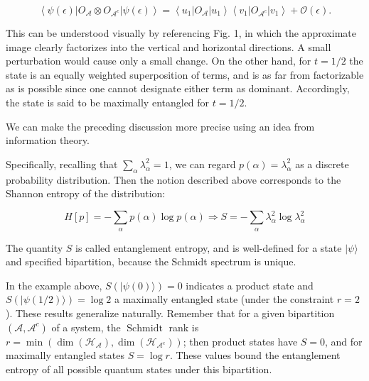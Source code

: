 \documentclass[12pt]{article}
\begin{document}
\begin{equation*}
\left\langle\psi(\epsilon)\left|O_{\mathcal{A}} \otimes O_{\mathcal{A}^{c}}\right| \psi(\epsilon)\right\rangle=\left\langle u_{1}\left|O_{\mathcal{A}}\right| u_{1}\right\rangle\left\langle v_{1}\left|O_{\mathcal{A}^{c}}\right| v_{1}\right\rangle+\mathcal{O}(\epsilon) . \tag{8}
\end{equation*}


This can be understood visually by referencing Fig. 1, in which the approximate image clearly factorizes into the vertical and horizontal directions. A small perturbation would cause only a small change. On the other hand, for $t=1 / 2$ the state is an equally weighted superposition of terms, and is as far from factorizable as is possible since one cannot designate either term as dominant. Accordingly, the state is said to be maximally entangled for $t=1 / 2$.

We can make the preceding discussion more precise using an idea from information theory.

Specifically, recalling that $\sum_{\alpha} \lambda_{\alpha}^{2}=1$, we can regard $p(\alpha)=\lambda_{\alpha}^{2}$ as a discrete probability distribution. Then the notion described above corresponds to the Shannon entropy of the distribution:


\begin{equation*}
H[p]=-\sum_{\alpha} p(\alpha) \log p(\alpha) \Longrightarrow S=-\sum_{\alpha} \lambda_{\alpha}^{2} \log \lambda_{\alpha}^{2} \tag{9}
\end{equation*}


The quantity $S$ is called entanglement entropy, and is well-defined for a state $|\psi\rangle$ and specified bipartition, because the Schmidt spectrum is unique.

In the example above, $S(|\psi(0)\rangle)=0$ indicates a product state and $S(|\psi(1 / 2)\rangle)=\log 2$ a maximally entangled state (under the constraint $r=2$ ). These results generalize naturally. Remember that for a given bipartition $\left(\mathcal{A}, \mathcal{A}^{c}\right)$ of a system, the $\operatorname{Schmidt}$ rank is $r=\min \left(\operatorname{dim}\left(\mathcal{H}_{\mathcal{A}}\right), \operatorname{dim}\left(\mathcal{H}_{\mathcal{A}^{c}}\right)\right)$; then product states have $S=0$, and for maximally entangled states $S=\log r$. These values bound the entanglement entropy of all possible quantum states under this bipartition.
\end{document}

